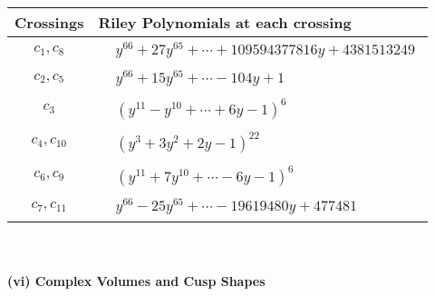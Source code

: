 \documentclass[1p]{elsarticle_modified}
\theoremstyle{definition}
\begin{document}
\begin{tabular}{m{50pt}|m{274pt}}
Crossings & \hspace{64pt}Riley Polynomials at each crossing \\
\hline $$\begin{aligned}c_{1},c_{8}\end{aligned}$$&$\begin{aligned}
&y^{66}+27 y^{65}+\cdots+109594377816 y+4381513249
\end{aligned}$\\
\hline $$\begin{aligned}c_{2},c_{5}\end{aligned}$$&$\begin{aligned}
&y^{66}+15 y^{65}+\cdots-104 y+1
\end{aligned}$\\
\hline $$\begin{aligned}c_{3}\end{aligned}$$&$\begin{aligned}
&(y^{11}- y^{10}+\cdots+6 y-1)^{6}
\end{aligned}$\\
\hline $$\begin{aligned}c_{4},c_{10}\end{aligned}$$&$\begin{aligned}
&(y^3+3 y^2+2 y-1)^{22}
\end{aligned}$\\
\hline $$\begin{aligned}c_{6},c_{9}\end{aligned}$$&$\begin{aligned}
&(y^{11}+7 y^{10}+\cdots-6 y-1)^{6}
\end{aligned}$\\
\hline $$\begin{aligned}c_{7},c_{11}\end{aligned}$$&$\begin{aligned}
&y^{66}-25 y^{65}+\cdots-19619480 y+477481
\end{aligned}$\\
\hline
\end{tabular}\\~\\
\newpage\flushleft \textbf{(vi) Complex Volumes and Cusp Shapes}
\end{document}
